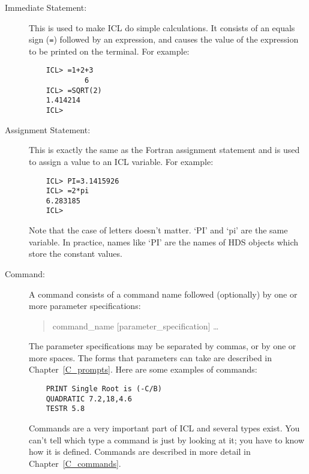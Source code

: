 \begin{description}

\item [Immediate Statement:] \mbox{}

 This is used to make ICL do simple calculations.
 It consists of an equals sign (\verb+=+) followed by an expression, and causes
 the value of the expression to be printed on the terminal.
 For example:

\begin{small}
\begin{verbatim}
    ICL> =1+2+3
             6
    ICL> =SQRT(2)
    1.414214
    ICL>
\end{verbatim}
\end{small}


\item [Assignment Statement:] \mbox{}

 This is exactly the same as the Fortran assignment statement and is used to
 assign a value to an ICL variable.
 For example:

\begin{small}
\begin{verbatim}
    ICL> PI=3.1415926    
    ICL> =2*pi           
    6.283185
    ICL>
\end{verbatim}
\end{small}

 Note that the case of letters doesn't matter.
 `PI' and `pi' are the same variable.
 In practice, names like `PI' are the names of HDS objects which store the
 constant values.

\item [Command:] \mbox{}

A command consists of a command name followed (optionally) by one or more
parameter specifications:
\begin{quote}
    command\_name [parameter\_specification] \ldots
\end{quote}
The parameter specifications may be separated by commas, or by one or more
spaces.
The forms that parameters can take are described in Chapter~\ref{C_prompts}.
Here are some examples of commands:

\begin{small}
\begin{verbatim}
    PRINT Single Root is (-C/B)
    QUADRATIC 7.2,18,4.6
    TESTR 5.8
\end{verbatim}
\end{small}

Commands are a very important part of ICL and several types exist.
You can't tell which type a command is just by looking at it; you have to
know how it is defined.
Commands are described in more detail in Chapter~\ref{C_commands}.
\end{description}

